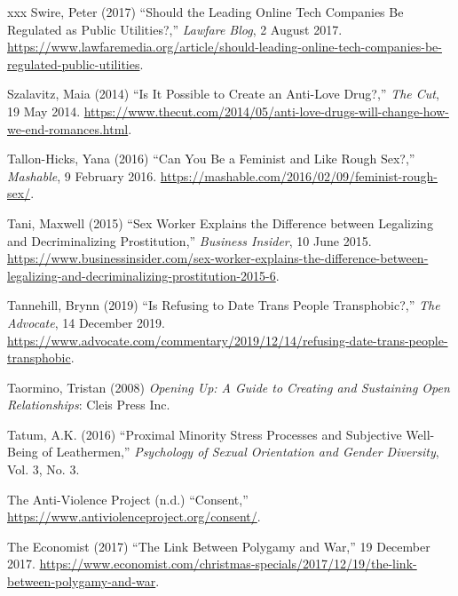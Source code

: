 \documentclass[]{jlreq} \usepackage{mystyle}
\begin{document}
\begin{thebibliography}{xxx}
Swire, Peter (2017) ``Should the Leading Online Tech Companies Be Regulated as
  Public Utilities?,'' \emph{Lawfare Blog}, 2 August 2017.
  \url{https://www.lawfaremedia.org/article/should-leading-online-tech-companies-be-regulated-public-utilities}.

Szalavitz, Maia (2014) ``Is It Possible to Create an Anti-Love Drug?,''
  \emph{The Cut}, 19 May 2014.
  \url{https://www.thecut.com/2014/05/anti-love-drugs-will-change-how-we-end-romances.html}.

Tallon-Hicks, Yana (2016) ``Can You Be a Feminist and Like Rough Sex?,''
  \emph{Mashable}, 9 February 2016.
  \url{https://mashable.com/2016/02/09/feminist-rough-sex/}.

Tani, Maxwell (2015) ``Sex Worker Explains the Difference between Legalizing
  and Decriminalizing Prostitution,'' \emph{Business Insider}, 10 June 2015.
  \url{https://www.businessinsider.com/sex-worker-explains-the-difference-between-legalizing-and-decriminalizing-prostitution-2015-6}.

Tannehill, Brynn (2019) ``Is Refusing to Date Trans People Transphobic?,''
  \emph{The Advocate}, 14 December 2019.
  \url{https://www.advocate.com/commentary/2019/12/14/refusing-date-trans-people-transphobic}.

Taormino, Tristan (2008)  \textit{ Opening Up: A Guide to Creating and
  Sustaining Open Relationships}: Cleis Press Inc.

Tatum, A.K. (2016) ``Proximal Minority Stress Processes and Subjective
  Well-Being of Leathermen,'' \textit{ Psychology of Sexual Orientation and
  Gender Diversity}, Vol. 3, No. 3.

{The Anti-Violence Project} (n.d.) ``Consent,''
  \url{https://www.antiviolenceproject.org/consent/}.

{The Economist} (2017) ``The Link Between Polygamy and War,'' 19 December 2017.
  \url{https://www.economist.com/christmas-specials/2017/12/19/the-link-between-polygamy-and-war}.


\end{thebibliography}
\end{document}
